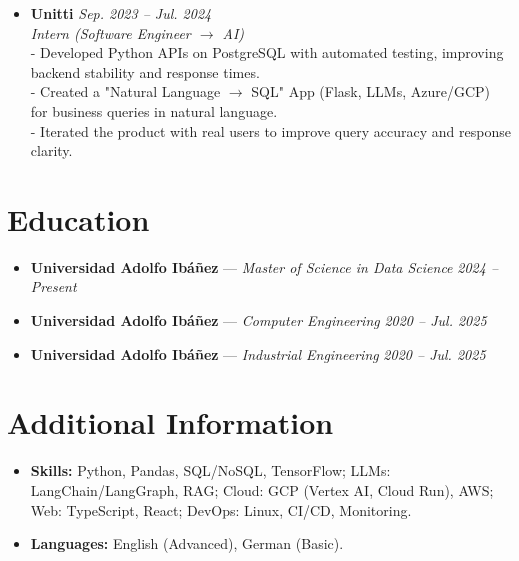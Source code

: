 \documentclass[a4paper,10pt]{article}
\begin{document}
\begin{itemize}[left=0pt,noitemsep,nolistsep]
    \item \textbf{Unitti} \hfill \textit{Sep. 2023 -- Jul. 2024} \\
    \textit{Intern (Software Engineer $\rightarrow$ AI)} \\
    - Developed Python APIs on PostgreSQL with automated testing, improving backend stability and response times. \\
    - Created a "Natural Language $\rightarrow$ SQL" App (Flask, LLMs, Azure/GCP) for business queries in natural language. \\
    - Iterated the product with real users to improve query accuracy and response clarity. \\

\end{itemize}

\section*{Education}
\begin{itemize}[left=0pt,itemsep=0.3em]
    \item \textbf{Universidad Adolfo Ibáñez} --- \textit{Master of Science in Data Science} \hfill \textit{2024 -- Present}
    \item \textbf{Universidad Adolfo Ibáñez} --- \textit{Computer Engineering} \hfill \textit{2020 -- Jul. 2025}
    \item \textbf{Universidad Adolfo Ibáñez} --- \textit{Industrial Engineering} \hfill \textit{2020 -- Jul. 2025}
\end{itemize}

\section*{Additional Information}
\begin{itemize}[left=0pt,noitemsep,nolistsep]
    \item \textbf{Skills:} Python, Pandas, SQL/NoSQL, TensorFlow; LLMs: LangChain/LangGraph, RAG; Cloud: GCP (Vertex AI, Cloud Run), AWS; Web: TypeScript, React; DevOps: Linux, CI/CD, Monitoring.
    \item \textbf{Languages:} English (Advanced), German (Basic).
\end{itemize}
\end{document}

